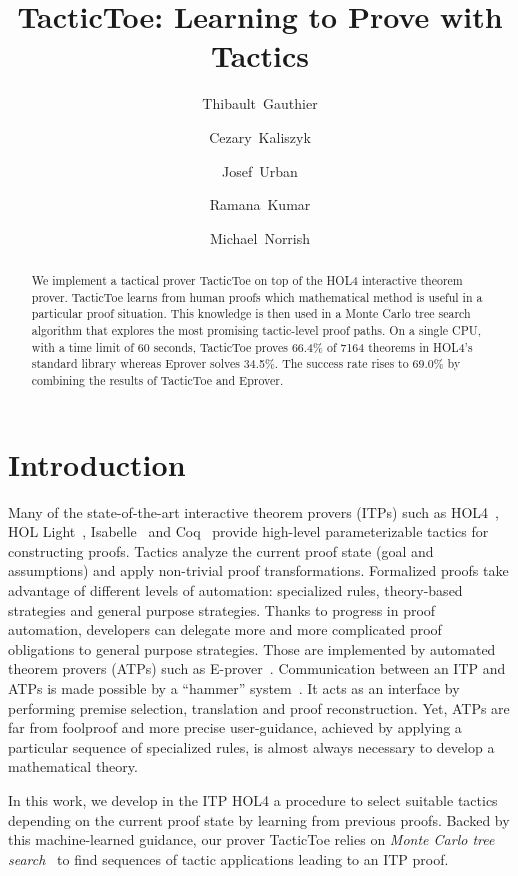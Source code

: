\documentclass[runningheads,a4paper,draft]{svjour3}
\title{TacticToe: Learning to Prove with Tactics}
\author{\mbox{Thibault Gauthier} \and \mbox{Cezary Kaliszyk} \and \mbox{Josef
Urban} \and \mbox{Ramana Kumar} \and \mbox{Michael Norrish}}
\institute{Thibault Gauthier and Cezary Kaliszyk \at
Department of Computer Science, University of Innsbruck,
Innsbruck, Austria\\ \url{{thibault.gauthier,cezary.kaliszyk}@uibk.ac.at}
\and
Josef Urban \at Czech Technical University, Prague\\\url{josef.urban@gmail.com}
\and Ramana Kumar and Michael Norrish \at Data61}
\def\holfour{\textsf{HOL4}\xspace}
\def\isabelle{\textsf{Isabelle}\xspace}
\def\hollight{\textsf{HOL Light}\xspace}
\def\coq{\textsf{Coq}\xspace}
\def\eprover{\textsf{E-prover}\xspace}
\def\tactictoe{\textsf{TacticToe}\xspace}
\begin{document}
\maketitle

\begin{abstract}
We implement a tactical prover TacticToe on top of the HOL4 interactive theorem
prover. TacticToe learns from human proofs which mathematical method is
useful in a particular proof situation.
This knowledge is then used in a Monte Carlo tree search algorithm that
explores the most promising tactic-level proof paths.
On a single CPU, with a time limit of 60 seconds, TacticToe proves 66.4\% of
7164 theorems in HOL4's standard library whereas
Eprover solves 34.5\%. The success rate rises to 69.0\% by combining the
results of TacticToe and Eprover.
\end{abstract}

\tableofcontents

\section{Introduction}
Many of the state-of-the-art interactive theorem provers (ITPs) such as
  \holfour~\cite{hol4}, \hollight~\cite{Harrison09hollight},
  \isabelle~\cite{isabelle}
  and \coq~\cite{coq-book} provide high-level parameterizable tactics for constructing proofs.
  Tactics analyze the current proof state (goal and
  assumptions) and apply non-trivial proof transformations.
  Formalized proofs take advantage of different levels of automation:
  specialized rules, theory-based strategies and general purpose strategies.
  Thanks to progress in proof
  automation, developers can delegate more and more complicated proof
  obligations to general purpose strategies. Those are implemented by automated
  theorem provers (ATPs) such as \eprover~\cite{eprover}. Communication
  between
  an ITP and ATPs is made possible by a ``hammer''
  system~\cite{hammers4qed,tgck-cpp15}. It acts as an interface by performing
  premise selection, translation and proof reconstruction.
  Yet, ATPs are far from foolproof and more precise user-guidance, achieved
  by applying a particular sequence of specialized rules, is almost always
  necessary to develop a mathematical theory.

  In this work, we develop in the ITP \holfour a procedure to select suitable
  tactics depending on the current proof state by learning
  from previous proofs. Backed by this machine-learned guidance, our prover
  \tactictoe relies on \emph{Monte
  Carlo tree search}~\cite{montecarlo} to find sequences of tactic applications
  leading to an ITP proof.
\end{document}
